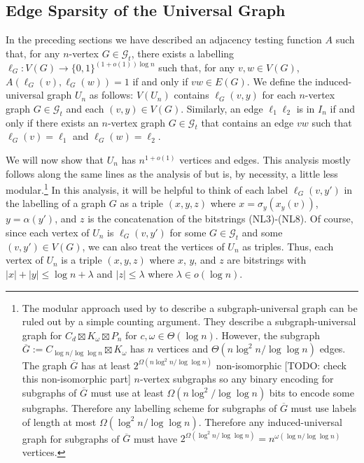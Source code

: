 \documentclass{patmorin}
\begin{document}
\subsection{Edge Sparsity of the Universal Graph}

In the preceding sections we have described an adjacency testing function $A$ such that, for any $n$-vertex $G\in \mathcal{G}_t$, there exists a labelling $\ell_G:V(G)\to\{0,1\}^{(1+o(1))\log n}$ such that, for any $v,w\in V(G)$, $A(\ell_G(v),\ell_G(w))=1$ if and only if $vw\in E(G)$.  We define the induced-universal graph $U_n$ as follows: $V(U_n)$ contains $\ell_G(v,y)$ for each $n$-vertex graph $G\in\mathcal{G}_t$ and each $(v,y)\in V(G)$. Similarly, an edge $\ell_1\ell_2$ is in $I_n$ if and only if there exists an $n$-vertex graph $G\in\mathcal{G}_t$ that contains an edge $vw$ such that $\ell_G(v)=\ell_1$ and $\ell_G(w)=\ell_2$.

We will now show that $U_n$ has $n^{1+o(1)}$ vertices and edges.  This analysis mostly follows along the same lines as the analysis of \citet{esperet.joret.ea:sparse} but is, by necessity, a little less modular.\footnote{The modular approach used by \citet{esperet.joret.ea:sparse} to describe a subgraph-universal graph can be ruled out by a simple counting argument.  They describe a subgraph-universal graph for $C_d\boxtimes K_\omega\boxtimes P_n$ for $c,\omega\in\Theta(\log n)$.  However, the subgraph $\overline{G}:=C_{\log n/\log\log n}\boxtimes K_\omega$ has $n$ vertices and $\Theta(n\log^2 n/\log\log n)$ edges.  The graph $\overline{G}$ has at least $2^{\Omega(n\log^2 n/\log\log n)}$ non-isomorphic [TODO: check this non-isomorphic part] $n$-vertex subgraphs so any binary encoding for subgraphs of $\overline{G}$ must use at least $\Omega(n\log^2/\log\log n)$ bits to encode some subgraphs.  Therefore any labelling scheme for subgraphs of $\overline{G}$ must use labels of length at most $\Omega(\log^2 n/\log\log n)$.  Therefore any induced-universal graph for subgraphs of $\overline{G}$ must have $2^{\Omega(\log^2 n/\log\log n)}=n^{\omega(\log n/\log\log n)}$ vertices.}
In this analysis, it will be helpful to think of each label $\ell_G(v,y')$ in the labelling of a graph $G$ as a triple $(x,y,z)$ where $x=\sigma_y(x_y(v))$, $y=\alpha(y')$, and $z$ is the concatenation of the bitstrings (NL3)-(NL8). Of course, since each vertex of $U_n$ is $\ell_G(v,y')$ for some $G\in\mathcal{G}_t$ and some $(v,y')\in V(G)$, we can also treat the vertices of $U_n$ as triples.  Thus, each vertex of $U_n$ is a triple $(x,y,z)$ where $x$, $y$, and $z$ are bitstrings with  $|x|+|y|\le \log n + \lambda$ and $|z|\le \lambda$ where $\lambda\in o(\log n)$.
\end{document}
